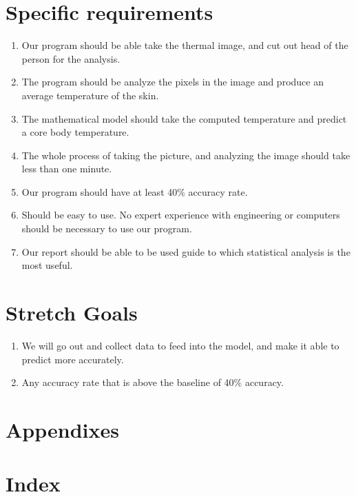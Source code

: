 \documentclass[10pt, draftclsnofoot, onecolumn]{IEEEtran}
\begin{document}
\section{Specific requirements}
	\begin{enumerate}
		\item Our program should be able take the thermal image, and cut out head of the person for the analysis.
		\item The program should be analyze the pixels in the image and produce an average temperature of the skin.
		\item The mathematical model should take the computed temperature and predict a core body temperature.
		\item The whole process of taking the picture, and analyzing the image should take less than one minute.
		\item Our program should have at least 40\% accuracy rate.
		\item Should be easy to use. No expert experience with engineering or computers should be necessary to use our program.
		\item Our report should be able to be used guide to which statistical analysis is the most useful.
	\end{enumerate}
\section{Stretch Goals}
	\begin{enumerate}
		\item We will go out and collect data to feed into the model, and make it able to predict more accurately.
		\item Any accuracy rate that is above the baseline of 40\% accuracy.
	\end{enumerate}
\section*{Appendixes}
\section*{Index}
\end{document}

